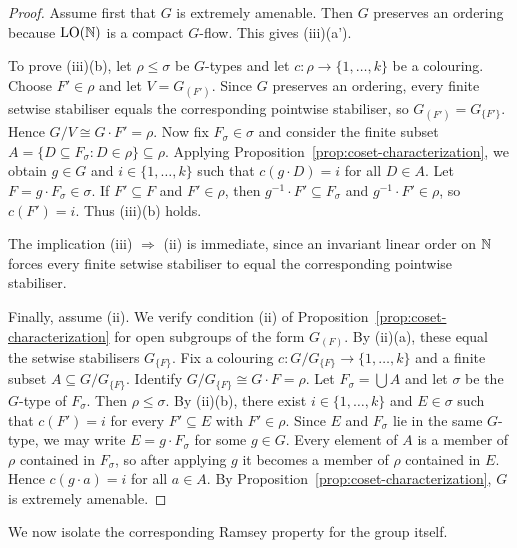 \begin{proof}


    Assume first that \(G\) is extremely amenable. Then \(G\) preserves an ordering because \(\operatorname{LO}(\mathbb{N})\) is a compact \(G\)-flow. This gives (iii)(a').

    To prove (iii)(b), let \(\rho\leq \sigma\) be \(G\)-types and let \(c\colon \rho\to\{1,\dots,k\}\) be a colouring.
    Choose \(F'\in\rho\) and let \(V=G_{(F')}\).
    Since \(G\) preserves an ordering, every finite setwise stabiliser equals the corresponding pointwise stabiliser, so \(G_{(F')}=G_{\{F'\}}\).
    Hence \(G/V \cong G\cdot F'=\rho\).
    Now fix \(F_\sigma\in\sigma\) and consider the finite subset \(A=\{D\subseteq F_\sigma : D\in\rho\}\subseteq \rho\).
    Applying Proposition~\ref{prop:coset-characterization}, we obtain \(g\in G\) and \(i\in\{1,\dots,k\}\) such that \(c(g\cdot D)=i\) for all \(D\in A\).
    Let \(F=g\cdot F_\sigma\in \sigma\).
    If \(F'\subseteq F\) and \(F'\in\rho\), then \(g^{-1}\cdot F'\subseteq F_\sigma\) and \(g^{-1}\cdot F'\in \rho\), so \(c(F')=i\).
    Thus (iii)(b) holds.

    The implication (iii) \(\Rightarrow\) (ii) is immediate, since an invariant linear order on \(\mathbb{N}\) forces every finite setwise stabiliser to equal the corresponding pointwise stabiliser.

    Finally, assume (ii).
    We verify condition (ii) of Proposition~\ref{prop:coset-characterization} for open subgroups of the form \(G_{(F)}\).
    By (ii)(a), these equal the setwise stabilisers \(G_{\{F\}}\).
    Fix a colouring \(c\colon G/G_{\{F\}} \to \{1,\dots,k\}\) and a finite subset \(A\subseteq G/G_{\{F\}}\).
    Identify \(G/G_{\{F\}} \cong G\cdot F = \rho\).
    Let \(F_\sigma=\bigcup A\) and let \(\sigma\) be the \(G\)-type of \(F_\sigma\).
    Then \(\rho\leq \sigma\).
    By (ii)(b), there exist \(i\in\{1,\dots,k\}\) and \(E\in \sigma\) such that \(c(F')=i\) for every \(F'\subseteq E\) with \(F'\in \rho\).
    Since \(E\) and \(F_\sigma\) lie in the same \(G\)-type, we may write \(E=g\cdot F_\sigma\) for some \(g\in G\).
    Every element of \(A\) is a member of \(\rho\) contained in \(F_\sigma\), so after applying \(g\) it becomes a member of \(\rho\) contained in \(E\).
    Hence \(c(g\cdot a)=i\) for all \(a\in A\).
    By Proposition~\ref{prop:coset-characterization}, \(G\) is extremely amenable.
\end{proof}
We now isolate the corresponding Ramsey property for the group itself.

